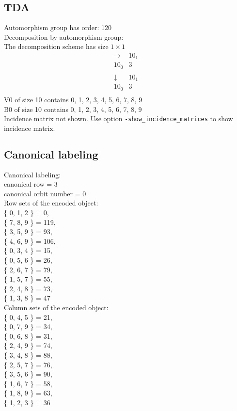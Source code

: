 \subsection*{TDA}
Automorphism group has order: 120\\
Decomposition by automorphism group:\\
The decomposition scheme has size $1 \times 1$\\
$$
\begin{array}{r|*{1}{r}}
\rightarrow  & 10_{1}\\
\hline
10_{0} & 3\\
\end{array}
$$
$$
\begin{array}{r|*{1}{r}}
\downarrow  & 10_{1}\\
\hline
10_{0} & 3\\
\end{array}
$$
V0 of size 10 contains 0, 1, 2, 3, 4, 5, 6, 7, 8, 9\\
B0 of size 10 contains 0, 1, 2, 3, 4, 5, 6, 7, 8, 9\\
Incidence matrix not shown. Use option \verb'-show_incidence_matrices' to show incidence matrix.\\
\subsection*{Canonical labeling}
Canonical labeling:\\
canonical row = 3\\
canonical orbit number = 0\\
Row sets of the encoded object:\\
\{ 0, 1, 2 \} = 0, \\
\{ 7, 8, 9 \} = 119, \\
\{ 3, 5, 9 \} = 93, \\
\{ 4, 6, 9 \} = 106, \\
\{ 0, 3, 4 \} = 15, \\
\{ 0, 5, 6 \} = 26, \\
\{ 2, 6, 7 \} = 79, \\
\{ 1, 5, 7 \} = 55, \\
\{ 2, 4, 8 \} = 73, \\
\{ 1, 3, 8 \} = 47\\
Column sets of the encoded object:\\
\{ 0, 4, 5 \} = 21, 
\\
\{ 0, 7, 9 \} = 34, 
\\
\{ 0, 6, 8 \} = 31, 
\\
\{ 2, 4, 9 \} = 74, 
\\
\{ 3, 4, 8 \} = 88, 
\\
\{ 2, 5, 7 \} = 76, 
\\
\{ 3, 5, 6 \} = 90, 
\\
\{ 1, 6, 7 \} = 58, 
\\
\{ 1, 8, 9 \} = 63, 
\\
\{ 1, 2, 3 \} = 36\\
